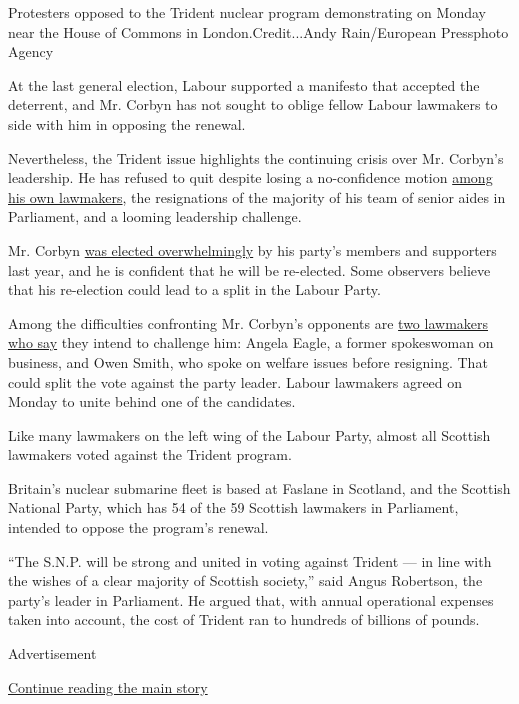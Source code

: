 Protesters opposed to the Trident nuclear program demonstrating on
Monday near the House of Commons in London.Credit...Andy Rain/European
Pressphoto Agency

At the last general election, Labour supported a manifesto that accepted
the deterrent, and Mr. Corbyn has not sought to oblige fellow Labour
lawmakers to side with him in opposing the renewal.

Nevertheless, the Trident issue highlights the continuing crisis over
Mr. Corbyn's leadership. He has refused to quit despite losing a
no-confidence motion
\href{http://www.nytimes.com/2016/06/29/world/europe/jeremy-corbyn-labour-party-brexit.html}{among
his own lawmakers}, the resignations of the majority of his team of
senior aides in Parliament, and a looming leadership challenge.

Mr. Corbyn
\href{http://www.nytimes.com/2015/09/13/world/europe/labour-party-election-jeremy-corbyn.html}{was
elected overwhelmingly} by his party's members and supporters last year,
and he is confident that he will be re-elected. Some observers believe
that his re-election could lead to a split in the Labour Party.

Among the difficulties confronting Mr. Corbyn's opponents are
\href{http://www.nytimes.com/2016/07/05/world/europe/brexit-briefing.html}{two
lawmakers who say} they intend to challenge him: Angela Eagle, a former
spokeswoman on business, and Owen Smith, who spoke on welfare issues
before resigning. That could split the vote against the party leader.
Labour lawmakers agreed on Monday to unite behind one of the candidates.

Like many lawmakers on the left wing of the Labour Party, almost all
Scottish lawmakers voted against the Trident program.

Britain's nuclear submarine fleet is based at Faslane in Scotland, and
the Scottish National Party, which has 54 of the 59 Scottish lawmakers
in Parliament, intended to oppose the program's renewal.

``The S.N.P. will be strong and united in voting against Trident --- in
line with the wishes of a clear majority of Scottish society,'' said
Angus Robertson, the party's leader in Parliament. He argued that, with
annual operational expenses taken into account, the cost of Trident ran
to hundreds of billions of pounds.

Advertisement

\protect\hyperlink{after-bottom}{Continue reading the main story}

